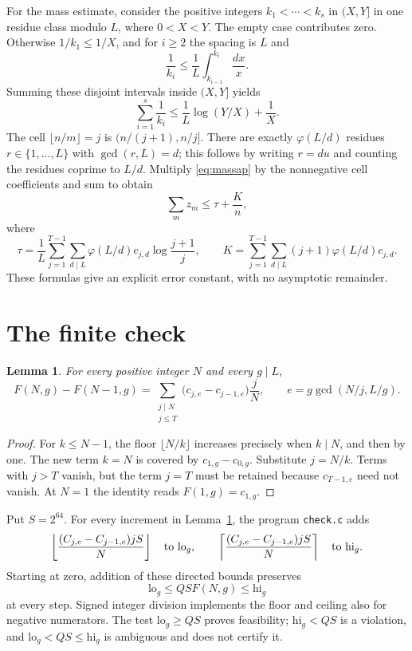 \documentclass[10pt]{article}
\newtheorem{lemma}[theorem]{Lemma}
\theoremstyle{remark}
\begin{document}
For the mass estimate, consider the positive integers
$k_1<\cdots<k_s$ in $(X,Y]$ in one residue class modulo $L$, where
$0<X<Y$. The empty case contributes zero. Otherwise $1/k_1\le1/X$,
and for $i\ge2$ the spacing is $L$ and
\[
 \frac1{k_i}\le\frac1L\int_{k_{i-1}}^{k_i}\frac{dx}{x}.
\]
Summing these disjoint intervals inside $(X,Y]$ yields
\begin{equation}\label{eq:massap}
 \sum_{i=1}^s\frac1{k_i}\le\frac1L\log(Y/X)+\frac1X.
\end{equation}
The cell $\lfloor n/m\rfloor=j$ is $(n/(j+1),n/j]$. There are exactly
$\varphi(L/d)$ residues $r\in\{1,\ldots,L\}$ with $\gcd(r,L)=d$;
this follows by writing $r=du$ and counting the residues coprime to
$L/d$. Multiply \eqref{eq:massap} by the nonnegative cell coefficients
and sum to obtain
\begin{equation}\label{eq:mass}
 \sum_m z_m\le\tau+\frac Kn,
\end{equation}
where
\begin{equation}\label{eq:tauK}
 \tau=\frac1L\sum_{j=1}^{T-1}\sum_{d\mid L}
 \varphi(L/d)c_{j,d}\log\frac{j+1}{j},\qquad
 K=\sum_{j=1}^{T-1}\sum_{d\mid L}(j+1)\varphi(L/d)c_{j,d}.
\end{equation}
These formulas give an explicit error constant, with no asymptotic
remainder.

\section{The finite check}\label{sec:finite}
\begin{lemma}\label{lem:increment}
For every positive integer $N$ and every $g\mid L$,
\[
 F(N,g)-F(N-1,g)
 =\sum_{\substack{j\mid N\\j\le T}}
 \bigl(c_{j,e}-c_{j-1,e}\bigr)\frac jN,
 \qquad e=g\gcd(N/j,L/g).
\]
\end{lemma}
\begin{proof}
For $k\le N-1$, the floor $\lfloor N/k\rfloor$ increases precisely
when $k\mid N$, and then by one. The new term $k=N$ is covered by
$c_{1,g}-c_{0,g}$. Substitute $j=N/k$. Terms with $j>T$ vanish, but the
term $j=T$ must be retained because $c_{T-1,e}$ need not vanish.
At $N=1$ the identity reads $F(1,g)=c_{1,g}$.
\end{proof}

Put $S=2^{64}$. For every increment in Lemma~\ref{lem:increment}, the
program \texttt{check.c} adds
\[
 \left\lfloor\frac{(C_{j,e}-C_{j-1,e})jS}{N}\right\rfloor
 \quad\hbox{to }\mathrm{lo}_g,\qquad
 \left\lceil\frac{(C_{j,e}-C_{j-1,e})jS}{N}\right\rceil
 \quad\hbox{to }\mathrm{hi}_g.
\]
Starting at zero, addition of these directed bounds preserves
\begin{equation}\label{eq:enclosure}
 \mathrm{lo}_g\le QS F(N,g)\le\mathrm{hi}_g
\end{equation}
at every step. Signed integer division implements the floor and ceiling
also for negative numerators. The test $\mathrm{lo}_g\ge QS$ proves
feasibility; $\mathrm{hi}_g<QS$ is a violation, and
$\mathrm{lo}_g<QS\le\mathrm{hi}_g$ is ambiguous and does not certify it.
\end{document}
